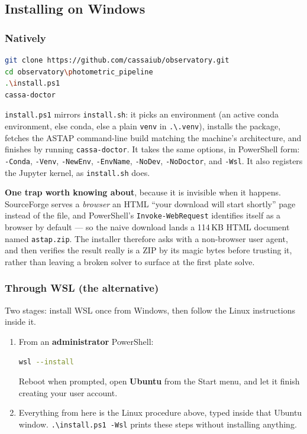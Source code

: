 \documentclass[11pt,a4paper]{article}
\begin{document}
\subsection{Installing on Windows}
\subsubsection{Natively}
\begin{lstlisting}[language=bash]
git clone https://github.com/cassaiub/observatory.git
cd observatory\photometric_pipeline
.\install.ps1
cassa-doctor
\end{lstlisting}

\texttt{install.ps1} mirrors \texttt{install.sh}: it picks an environment (an
active conda environment, else conda, else a plain \texttt{venv} in
\texttt{.\textbackslash.venv}), installs the package, fetches the ASTAP
command-line build matching the machine's architecture, and finishes by running
\texttt{cassa-doctor}. It takes the same options, in PowerShell form:
\texttt{-Conda}, \texttt{-Venv}, \texttt{-NewEnv}, \texttt{-EnvName},
\texttt{-NoDev}, \texttt{-NoDoctor}, and \texttt{-Wsl}. It also registers the
Jupyter kernel, as \texttt{install.sh} does.

\begin{mdframed}[backgroundcolor=rawbg, linecolor=primary, linewidth=1pt, roundcorner=4pt]
\textbf{One trap worth knowing about}, because it is invisible when it happens.
SourceForge serves a \emph{browser} an HTML ``your download will start shortly''
page instead of the file, and PowerShell's \texttt{Invoke-WebRequest} identifies
itself as a browser by default --- so the naive download lands a 114\,KB HTML
document named \texttt{astap.zip}. The installer therefore asks with a
non-browser user agent, and then verifies the result really is a ZIP by its
magic bytes before trusting it, rather than leaving a broken solver to surface
at the first plate solve.
\end{mdframed}

\subsubsection{Through WSL (the alternative)}
Two stages: install WSL once from Windows, then follow the Linux instructions
inside it.

\begin{enumerate}[leftmargin=*]
    \item From an \textbf{administrator} PowerShell:
\begin{lstlisting}[language=bash]
wsl --install
\end{lstlisting}
    Reboot when prompted, open \textbf{Ubuntu} from the Start menu, and let it
    finish creating your user account.

    \item Everything from here is the Linux procedure above, typed inside that
    Ubuntu window. \texttt{.\textbackslash install.ps1 -Wsl} prints these steps
    without installing anything.
\end{enumerate}
\end{document}
